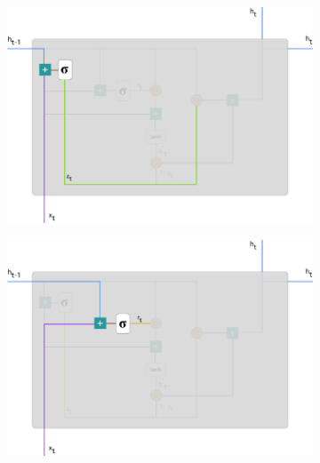 \documentclass[twoside,11pt,a4paper]{article}
\begin{document}
\begin{figure}[h!]
	
	\begin{subfigure}{0.49 \textwidth}
		\includegraphics[width=1\linewidth, height=1\linewidth]{gru_ugate}
		\label{fig:gru_ugate}
	\end{subfigure}
	\hfill
	\begin{subfigure}{0.49 \textwidth}
		\includegraphics[width=1\linewidth, height=1\linewidth]{gru_rgate}

\end{subfigure}
\end{figure}
\end{document}

